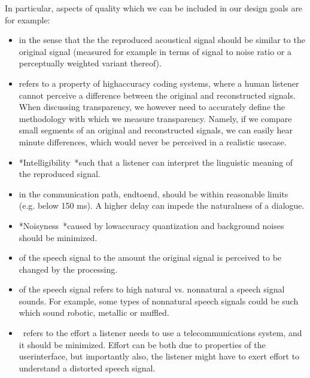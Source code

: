 \documentclass[letterpaper,10pt,english]{jupyterBook}
\begin{document}
\sphinxAtStartPar
In particular, aspects of quality which we can be included in our design
goals are for example:
\begin{itemize}
\item {} 
\sphinxAtStartPar
{} in the sense that the the reproduced acoustical
signal should be similar to the original signal (measured for
example in terms of signal to noise ratio or a perceptually weighted
variant thereof).

\item {} 
\sphinxAtStartPar
{} refers to a property of high\sphinxhyphen{}accuracy
coding systems, where a human listener cannot perceive a difference
between the original and reconstructed signals. When discussing
transparency, we however need to accurately define the methodology
with which we measure transparency. Namely, if we compare small
segments of an original and reconstructed signals, we can easily
hear minute differences, which would never be perceived in a
realistic use\sphinxhyphen{}case.

\item {} 
\sphinxAtStartPar
*Intelligibility *such that a listener can interpret the linguistic
meaning of the reproduced signal.

\item {} 
\sphinxAtStartPar
{} in the communication path, end\sphinxhyphen{}to\sphinxhyphen{}end, should be within
reasonable limits (e.g. below 150 ms). A higher delay can impede the
naturalness of a dialogue.

\item {} 
\sphinxAtStartPar
*Noisyness *caused by low\sphinxhyphen{}accuracy quantization and background
noises should be minimized.

\item {} 
\sphinxAtStartPar
{} of the speech signal to the amount the original signal
is perceived to be changed by the processing.

\item {} 
\sphinxAtStartPar
{} of the speech signal refers to high natural vs.
non\sphinxhyphen{}natural a speech signal sounds. For example, some types of
non\sphinxhyphen{}natural speech signals could be such which sound robotic,
metallic or muffled.

\item {} 
\sphinxAtStartPar
{} refers to the effort a listener needs to use a
telecommunications system, and it should be minimized. Effort can be
both due to properties of the user\sphinxhyphen{}interface, but importantly also,
the listener might have to exert effort to understand a distorted
speech signal.


\end{itemize}
\end{document}
